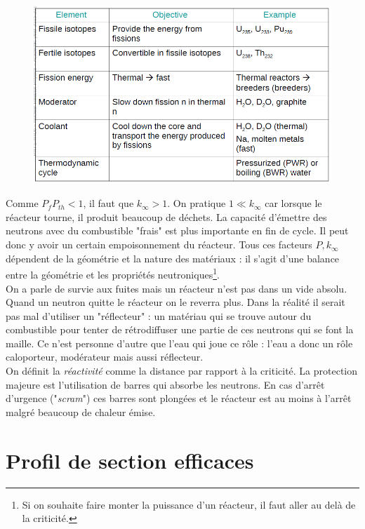 	\begin{figure}
	\vspace{-5mm}
	\includegraphics[scale=0.25]{ch1/image8.png}
	\end{figure}
Comme $P_fP_{th} < 1$, il faut que $k_\infty > 1$. On pratique $1 \ll k_\infty$ car lorsque le 
réacteur tourne, il produit beaucoup de déchets. La capacité d'émettre des neutrons avec du 
combustible "frais" est plus importante en fin de cycle. Il peut donc y avoir un certain 
empoisonnement du réacteur. Tous ces facteurs $P,k_\infty$ dépendent de la géométrie et la 
nature des matériaux : il s'agit d'une balance entre la géométrie et les propriétés 
neutroniques\footnote{Si on souhaite faire monter la puissance d'un réacteur, il faut 
aller au delà de la criticité.}.\\


On a parle de survie aux fuites  mais un réacteur n'est pas dans un vide absolu. Quand un 
neutron quitte le réacteur on le reverra plus. Dans la réalité il serait pas mal d'utiliser 
un "réflecteur" : un matériau qui se trouve autour du combustible pour tenter de 
rétrodiffuser une partie de ces neutrons qui se font la maille. Ce n'est personne d'autre 
que l'eau qui joue ce rôle : l'eau a donc un rôle caloporteur, modérateur mais aussi réflecteur. \\

On définit la \textit{réactivité} comme la distance par rapport à la criticité. La protection 
majeure est l'utilisation de barres qui absorbe les neutrons. En cas d'arrêt d'urgence 
("\textit{scram}") ces barres sont plongées et le réacteur est au moins à l'arrêt malgré beaucoup de
chaleur émise.

\section{Profil de section efficaces}
